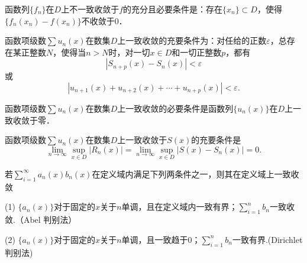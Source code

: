 \documentclass[../../main.tex]{subfiles}
\begin{document}
\begin{corollary}
函数列\(\{f_n\}\)在\(D\)上不一致收敛于\(f\)的充分且必要条件是：存在\(\{x_n\} \subset D\)，使得\(\{f_n(x_n) - f(x_n)\}\)不收敛于\(0\)．
\end{corollary}

\begin{theorem}[一致收敛的柯西准则]\label{theorem:一致收敛的柯西准则}
函数项级数\(\sum u_n(x)\)在数集\(D\)上一致收敛的充要条件为：对任给的正数\(\varepsilon\)，总存在某正整数\(N\)，使得当\(n > N\)时，对一切\(x \in D\)和一切正整数\(p\)，都有
\[
|S_{n + p}(x) - S_n(x)| < \varepsilon
\]
或
\[
|u_{n + 1}(x) + u_{n + 2}(x) + \cdots + u_{n + p}(x)| < \varepsilon.
\]
\end{theorem}

\begin{corollary}
函数项级数\(\sum u_n(x)\)在数集\(D\)上一致收敛的必要条件是函数列\(\{u_n(x)\}\)在\(D\)上一致收敛于零．
\end{corollary} 

\begin{theorem}
函数项级数\(\sum u_n(x)\)在数集\(D\)上一致收敛于\(S(x)\)的充要条件是
\[
\lim_{n \to \infty} \sup_{x \in D} |R_n(x)| = \lim_{n \to \infty} \sup_{x \in D} |S(x) - S_n(x)| = 0.
\]
\end{theorem}

\begin{theorem}[A-D判别法]\label{theorem:级数一致收敛的A-D判别法}
若\(\sum_{i = 1}^{\infty} a_n(x)b_n(x)\)在定义域内满足下列两条件之一，则其在定义域上一致收敛

(1) \(\{a_n(x)\}\)对于固定的\(x\)关于\(n\)单调，且在定义域内一致有界；\(\sum_{i = 1}^{n} b_n\)一致收敛.（Abel 判别法）

(2) \(\{a_n(x)\}\)对于固定的\(x\)关于\(n\)单调，且一致趋于\(0\)；\(\sum_{i = 1}^{n} b_n\)一致有界.(Dirichlet判别法)
\end{theorem}
\end{document}
